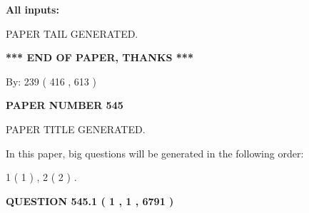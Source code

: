\documentclass[12pt]{article}
\begin{document}
   
   
   
\noindent{}
   
   
   
   
\noindent\vspace{0.1in}\hspace{-0.08in} {\textbf{\Large{All inputs: }}}
   
   
   
   
   
   
 \vspace{0.2in}
 
   
   
\vspace{2.0in} PAPER TAIL GENERATED.
   
   
   
   
\vspace{1.0in} 
{\textbf{\large{ *** END OF PAPER, THANKS *** }}} 
   
   
\hspace{1.0in} By: 
 239 ( 416 ,  613 )
   
   
   
   
\newpage 
\setcounter{page}{ 
   545001 } 
   
   
   
   
 {\textbf{ \Large{ PAPER NUMBER  545  }}}
   
   
\vspace{0.2in}
   
   
   
   
   
   
   
   
 \vspace{0.2in}
 
 
 
 
   
   
 PAPER TITLE GENERATED.
   
   
   
\vspace{0.2in}
   
In this paper, big questions will be generated in the following order: 
   
   
   1 ( 1 )
 ,
   2 ( 2 )
 .
  
\vspace{0.2in}
  
{\textbf{\Large{QUESTION
545.1 
 ( 1 , 1 , 6791 )
}}}
  
\end{document}

